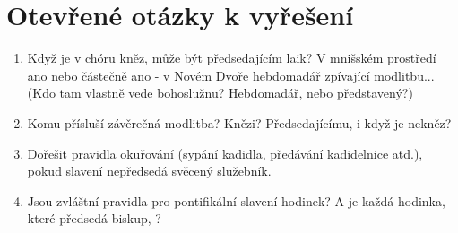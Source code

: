 \section*{Otevřené otázky k vyřešení}

\begin{enumerate}
\item Když je v chóru kněz, může být předsedajícím laik?
V mnišském prostředí ano nebo částečně ano - v Novém Dvoře hebdomadář
zpívající modlitbu... (Kdo tam vlastně vede bohoslužnu? Hebdomadář, nebo
představený?)

\item Komu přísluší závěrečná modlitba? Knězi? Předsedajícímu, i když je
nekněz?

\item Dořešit pravidla okuřování (sypání kadidla, předávání kadidelnice atd.),
pokud slavení nepředsedá svěcený služebník.

\item Jsou zvláštní pravidla pro pontifikální slavení hodinek?
A je každá hodinka, které předsedá biskup, ?

\end{enumerate}
